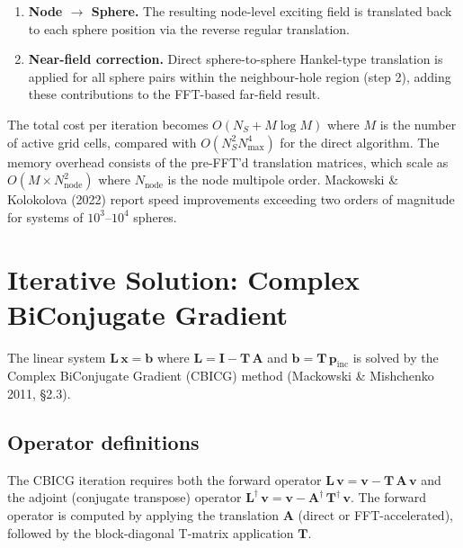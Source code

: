 \documentclass[11pt,a4paper]{article}
\begin{document}
\begin{enumerate}[nosep]
  \item \textbf{Node $\to$ Sphere.}
  The resulting node-level exciting field is translated back to each sphere position via the reverse regular translation.

  \item \textbf{Near-field correction.}
  Direct sphere-to-sphere Hankel-type translation is applied for all sphere pairs within the neighbour-hole region (step 2), adding these contributions to the FFT-based far-field result.
\end{enumerate}

The total cost per iteration becomes $O(N_S + M \log M)$ where $M$ is the number of active grid cells, compared with $O(N_S^2 N_\mathrm{max}^4)$ for the direct algorithm.
The memory overhead consists of the pre-FFT'd translation matrices, which scale as $O(M \times N_\mathrm{node}^2)$ where $N_\mathrm{node}$ is the node multipole order.
Mackowski \& Kolokolova (2022) report speed improvements exceeding two orders of magnitude for systems of $10^3$--$10^4$ spheres.

\section{Iterative Solution: Complex BiConjugate Gradient}
\label{sec:cbicg}

The linear system $\mathbf{L}\,\bm{x} = \bm{b}$ where $\mathbf{L} = \mathbf{I} - \mathbf{T}\,\mathbf{A}$ and $\bm{b} = \mathbf{T}\,\bm{p}_\mathrm{inc}$ is solved by the Complex BiConjugate Gradient (CBICG) method (Mackowski \& Mishchenko 2011, \S 2.3).

\subsection{Operator definitions}

The CBICG iteration requires both the forward operator $\mathbf{L}\,\bm{v} = \bm{v} - \mathbf{T}\,\mathbf{A}\,\bm{v}$ and the adjoint (conjugate transpose) operator $\mathbf{L}^\dagger\,\bm{v} = \bm{v} - \mathbf{A}^\dagger\,\mathbf{T}^\dagger\,\bm{v}$.
The forward operator is computed by applying the translation $\mathbf{A}$ (direct or FFT-accelerated), followed by the block-diagonal T-matrix application $\mathbf{T}$.
\end{document}
